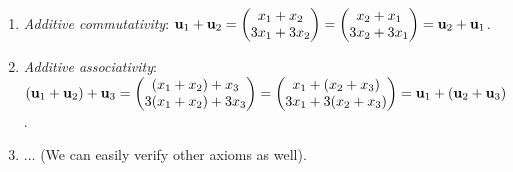 \begin{example}
\begin{enumerate}
		\item \emph{Additive commutativity}: ${\bf u}_1 + {\bf u}_2 = \begin{pmatrix} x_1 + x_2 \\ 3x_1 + 3x_2 \end{pmatrix} = \begin{pmatrix} x_2 + x_1 \\ 3x_2 + 3x_1 \end{pmatrix} = {\bf u}_2 + {\bf u}_1$.

		\item \emph{Additive associativity}: $({\bf u}_1 + {\bf u}_2) + {\bf u}_3 = \begin{pmatrix} (x_1 + x_2) + x_3 \\ 3(x_1 + x_2) + 3x_3\end{pmatrix}=\begin{pmatrix} x_1 + (x_2 + x_3) \\ 3x_1 + 3(x_2 + x_3)\end{pmatrix} = {\bf u}_1 + ({\bf u}_2 + {\bf u}_3)$.

		\item $\dots$ (We can easily verify other axioms as well).
	\end{enumerate} 
\end{example} 

